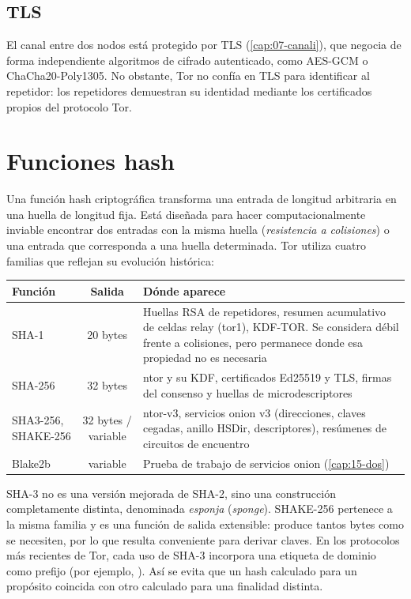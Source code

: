 \subsection{TLS}

El canal entre dos nodos está protegido por TLS (\cref{cap:07-canali}), que negocia de forma independiente algoritmos de cifrado autenticado, como AES-GCM o ChaCha20-Poly1305. No obstante, Tor no confía en TLS para identificar al repetidor: los repetidores demuestran su identidad mediante los certificados propios del protocolo Tor.

\section{Funciones hash}\label{sec:cripto-hash}

Una función hash criptográfica transforma una entrada de longitud arbitraria en una huella de longitud fija. Está diseñada para hacer computacionalmente inviable encontrar dos entradas con la misma huella (\emph{resistencia a colisiones}) o una entrada que corresponda a una huella determinada. Tor utiliza cuatro familias que reflejan su evolución histórica:

\begin{center}\small
\begin{tabularx}{\textwidth}{@{}l c >{\raggedright\arraybackslash}X@{}}
\toprule
Función & Salida & Dónde aparece \\
\midrule
SHA-1 & 20 bytes & Huellas RSA de repetidores, resumen acumulativo de celdas relay (tor1), KDF-TOR. Se considera débil frente a colisiones, pero permanece donde esa propiedad no es necesaria \\
SHA-256 & 32 bytes & ntor y su KDF, certificados Ed25519 y TLS, firmas del consenso y huellas de microdescriptores \\
SHA3-256, SHAKE-256 & 32 bytes / variable & ntor-v3, servicios onion v3 (direcciones, claves cegadas, anillo HSDir, descriptores), resúmenes de circuitos de encuentro \\
Blake2b & variable & Prueba de trabajo de servicios onion (\cref{cap:15-dos}) \\
\bottomrule
\end{tabularx}
\end{center}

SHA-3 no es una versión mejorada de SHA-2, sino una construcción completamente distinta, denominada \emph{esponja} (\emph{sponge}). SHAKE-256 pertenece a la misma familia y es una función de salida extensible: produce tantos bytes como se necesiten, por lo que resulta conveniente para derivar claves. En los protocolos más recientes de Tor, cada uso de SHA-3 incorpora una etiqueta de dominio como prefijo (por ejemplo, ). Así se evita que un hash calculado para un propósito coincida con otro calculado para una finalidad distinta.

